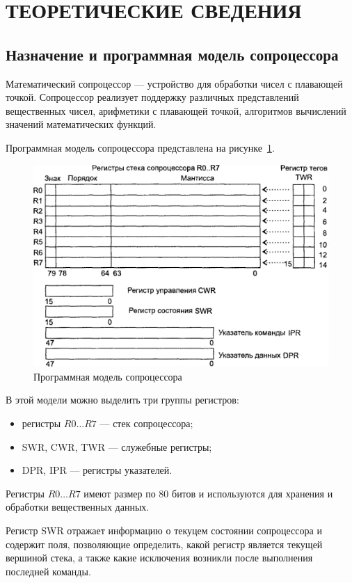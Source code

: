 \section{ТЕОРЕТИЧЕСКИЕ СВЕДЕНИЯ}

\subsection{Назначение и программная модель сопроцессора}

Математический сопроцессор --- устройство для обработки чисел с плавающей точкой.
Сопроцессор реализует поддержку различных представлений вещественных чисел,
арифметики с плавающей точкой, алгоритмов вычислений значений математических функций.

Программная модель сопроцессора представлена на рисунке~\ref{pic:program_model}.

\begin{figure}[h!]
  \centering
  \includegraphics[width=0.8\linewidth]{pic/program_model}
  \caption{Программная модель сопроцессора}
  \label{pic:program_model}
\end{figure}

В этой модели можно выделить три группы регистров:
\begin{itemize}
\item регистры $R0 \dots R7$ --- стек сопроцессора;
\item SWR, CWR, TWR --- служебные регистры;
\item DPR, IPR --- регистры указателей.
\end{itemize}

Регистры $R0 \dots R7$ имеют размер по 80 битов и используются для
хранения и обработки вещественных данных.

Регистр SWR отражает информацию о текуцем состоянии сопроцессора и
содержит поля, позволяющие определить, какой регистр является текущей вершиной
стека, а также какие исключения возникли после выполнения последней команды.

